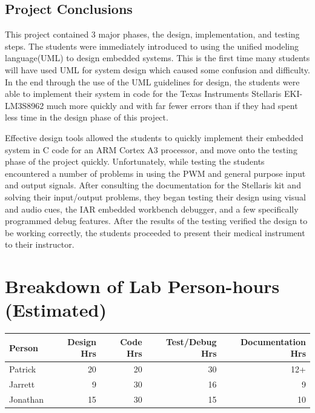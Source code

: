 \documentclass[12pt]{article} %
\begin{document}
    \subsection{Project Conclusions} 
    
    This project contained 3 major phases, the design, implementation, and
    testing steps. The students were immediately introduced to using the
    unified modeling language(UML) to design embedded systems. This is the
    first time many students will have used UML for system design which caused
    some confusion and difficulty. In the end through the use of the UML
    guidelines for design, the students were able to implement their system in
    code for the Texas Instruments Stellaris EKI-LM3S8962 much more quickly and
    with far fewer errors than if they had spent less time in the design phase
    of this project. 

    Effective design tools allowed the students to quickly implement their embedded
    system in C code for an ARM Cortex A3 processor, and move onto the testing
    phase of the project quickly. Unfortunately, while testing the students
    encountered a number of problems in using the PWM and general purpose input and
    output signals. After consulting the documentation for the Stellaris kit and
    solving their input/output problems, they began testing their design using
    visual and audio cues, the IAR embedded workbench debugger, and a few
    specifically programmed debug features. After the results of the testing
    verified the design to be working correctly, the students proceeded to present
    their medical instrument to their instructor.

    \pagebreak
    \appendix

    \section{Breakdown of Lab Person-hours (Estimated)}

    \begin{tabular}{|l|*{4}{r|}}
      \hline
      Person & Design Hrs & Code Hrs & Test/Debug Hrs & Documentation Hrs \\ \hline
      Patrick & 20 & 20 & 30 & 12+  \\ \hline
			Jarrett & 9 & 30 & 16 & 9 \\ \hline
      Jonathan & 15 & 30 & 15 & 10  \\ \hline
    \end{tabular}
\end{document}
